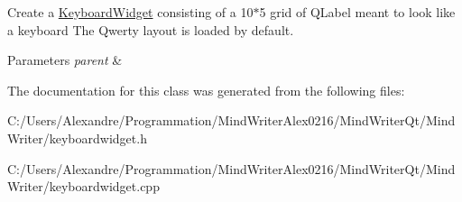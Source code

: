 Create a \hyperlink{class_keyboard_widget}{Keyboard\-Widget} consisting of a 10$\ast$5 grid of Q\-Label meant to look like a keyboard The Qwerty layout is loaded by default. 


\begin{DoxyParams}{Parameters}
{\em parent} & \\
\hline
\end{DoxyParams}


The documentation for this class was generated from the following files\-:\begin{DoxyCompactItemize}
\item 
C\-:/\-Users/\-Alexandre/\-Programmation/\-Mind\-Writer\-Alex0216/\-Mind\-Writer\-Qt/\-Mind\-Writer/keyboardwidget.\-h\item 
C\-:/\-Users/\-Alexandre/\-Programmation/\-Mind\-Writer\-Alex0216/\-Mind\-Writer\-Qt/\-Mind\-Writer/keyboardwidget.\-cpp\end{DoxyCompactItemize}
